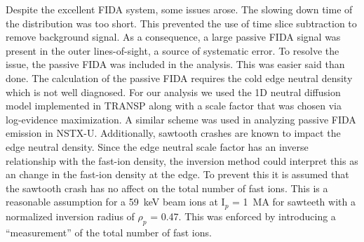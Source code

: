 Despite the excellent FIDA system, some issues arose. The slowing down time of the distribution was too short. This prevented the use of time slice subtraction to remove background signal. As a consequence, a large passive FIDA signal was present in the outer lines-of-sight, a source of systematic error. To resolve the issue, the passive FIDA was included in the analysis. This was easier said than done. The calculation of the passive FIDA requires the cold edge neutral density which is not well diagnosed. For our analysis we used the 1D neutral diffusion model implemented in TRANSP along with a scale factor that was chosen via log-evidence maximization. A similar scheme was used in analyzing passive FIDA emission in NSTX-U\cite{hao2018measurement}. Additionally, sawtooth crashes are known to impact the edge neutral density. Since the edge neutral scale factor has an inverse relationship with the fast-ion density, the inversion method could interpret this as an change in the fast-ion density at the edge. To prevent this it is assumed that the sawtooth crash has no affect on the total number of fast ions. This is a reasonable assumption for a 59~keV beam ions at I$_p$ = 1~MA for sawteeth with a normalized inversion radius of $\rho_p$ = 0.47. This was enforced by introducing a ``measurement'' of the total number of fast ions.

